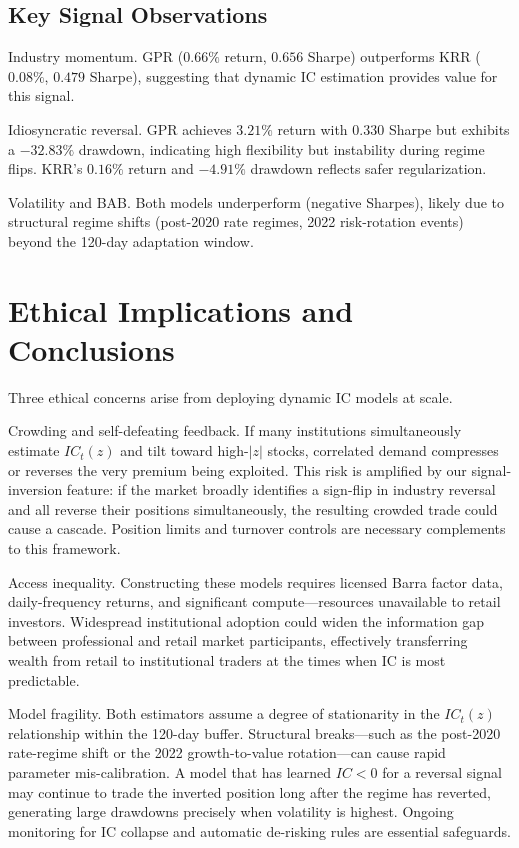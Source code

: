 \documentclass[11pt]{amsart}
\begin{document}
\subsection{Key Signal Observations}

Industry momentum.
GPR ($0.66\%$ return, $0.656$ Sharpe) outperforms KRR ($0.08\%$, $0.479$ Sharpe),
suggesting that dynamic IC estimation provides value for this signal.

Idiosyncratic reversal.
GPR achieves $3.21\%$ return with $0.330$ Sharpe but exhibits a $-32.83\%$
drawdown, indicating high flexibility but instability during regime flips.
KRR's $0.16\%$ return and $-4.91\%$ drawdown reflects safer regularization.

Volatility and BAB.
Both models underperform (negative Sharpes), likely due to structural regime
shifts (post-2020 rate regimes, 2022 risk-rotation events) beyond the 120-day
adaptation window.

\section{Ethical Implications and Conclusions}

Three ethical concerns arise from deploying dynamic IC models at scale.

Crowding and self-defeating feedback.
If many institutions simultaneously estimate $IC_t(z)$ and tilt toward
high-$|z|$ stocks, correlated demand compresses or reverses the very
premium being exploited.  This risk is amplified by our signal-inversion
feature: if the market broadly identifies a sign-flip in industry reversal
and all reverse their positions simultaneously, the resulting crowded trade
could cause a cascade.  Position limits and turnover controls are necessary
complements to this framework.

Access inequality.
Constructing these models requires licensed Barra factor data, daily-frequency
returns, and significant compute---resources unavailable to retail investors.
Widespread institutional adoption could widen the information gap between
professional and retail market participants, effectively transferring wealth
from retail to institutional traders at the times when IC is most predictable.

Model fragility.
Both estimators assume a degree of stationarity in the $IC_t(z)$
relationship within the 120-day buffer.  Structural breaks---such as the
post-2020 rate-regime shift or the 2022 growth-to-value rotation---can cause
rapid parameter mis-calibration.  A model that has learned $IC < 0$ for
a reversal signal may continue to trade the inverted position long after
the regime has reverted, generating large drawdowns precisely when volatility
is highest.  Ongoing monitoring for IC collapse and automatic de-risking
rules are essential safeguards.
\end{document}
